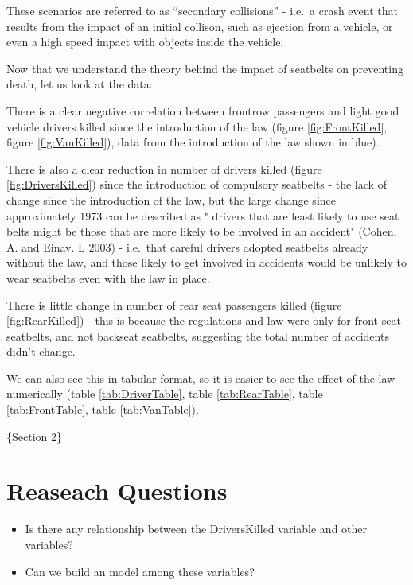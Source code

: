 \documentclass[11pt,a4paper,]{article}
\begin{document}
These scenarios are referred to as ``secondary collisions'' - i.e.~a crash event that results from the impact of an initial collison, such as ejection from a vehicle, or even a high speed impact with objects inside the vehicle.

Now that we understand the theory behind the impact of seatbelts on preventing death, let us look at the data:

There is a clear negative correlation between frontrow passengers and light good vehicle drivers killed since the introduction of the law (figure \ref{fig:FrontKilled}, figure \ref{fig:VanKilled}), data from the introduction of the law shown in blue).

There is also a clear reduction in number of drivers killed (figure \ref{fig:DriversKilled}) since the introduction of compulsory seatbelts - the lack of change since the introduction of the law, but the large change since approximately 1973 can be described as " drivers that are least likely to use seat belts might be those that are more likely to be involved in an accident" (Cohen, A. and Einav. L 2003) - i.e.~that careful drivers adopted seatbelts already without the law, and those likely to get involved in accidents would be unlikely to wear seatbelts even with the law in place.

There is little change in number of rear seat passengers killed (figure \ref{fig:RearKilled}) - this is because the regulations and law were only for front seat seatbelts, and not backseat seatbelts, suggesting the total number of accidents didn't change.

We can also see this in tabular format, so it is easier to see the effect of the law numerically (table \ref{tab:DriverTable}, table \ref{tab:RearTable}, table \ref{tab:FrontTable}, table \ref{tab:VanTable}).

\clearpage

\{Section 2\}

\hypertarget{reaseach-questions}{%
\section{Reaseach Questions}\label{reaseach-questions}}

\begin{itemize}
\item
  Is there any relationship between the DriversKilled variable and other variables?
\item
  Can we build an model among these variables?
\end{itemize}
\end{document}
